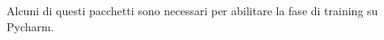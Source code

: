 Alcuni di questi pacchetti sono necessari per abilitare la fase di training su Pycharm.

































































